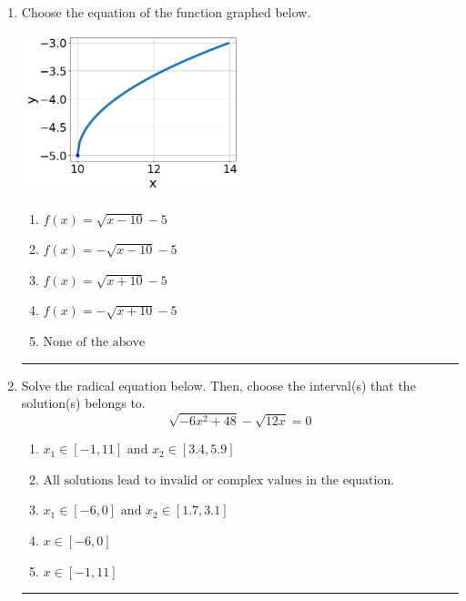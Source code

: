 \documentclass[14pt]{extbook}
\newcommand{\litem}[1]{\item#1\hspace*{-1cm}\rule{\textwidth}{0.4pt}}
\begin{document}
\begin{enumerate}
{\begin{enumerate}[label=\Alph*.]
\end{enumerate} }
\litem{
Choose the equation of the function graphed below.
\begin{center}
    \includegraphics[width=0.5\textwidth]{../Figures/radicalGraphToEquationCopyC.png}
\end{center}
\begin{enumerate}[label=\Alph*.]
\item \( f(x) = \sqrt{x - 10} - 5 \)
\item \( f(x) = - \sqrt{x - 10} - 5 \)
\item \( f(x) = \sqrt{x + 10} - 5 \)
\item \( f(x) = - \sqrt{x + 10} - 5 \)
\item \( \text{None of the above} \)

\end{enumerate} }
\litem{
Solve the radical equation below. Then, choose the interval(s) that the solution(s) belongs to.\[ \sqrt{-6 x^2 + 48} - \sqrt{12 x} = 0 \]\begin{enumerate}[label=\Alph*.]
\item \( x_1 \in [-1, 11] \text{ and } x_2 \in [3.4,5.9] \)
\item \( \text{All solutions lead to invalid or complex values in the equation.} \)
\item \( x_1 \in [-6, 0] \text{ and } x_2 \in [1.7,3.1] \)
\item \( x \in [-6,0] \)
\item \( x \in [-1,11] \)

\end{enumerate} }
\end{enumerate}
\end{document}
